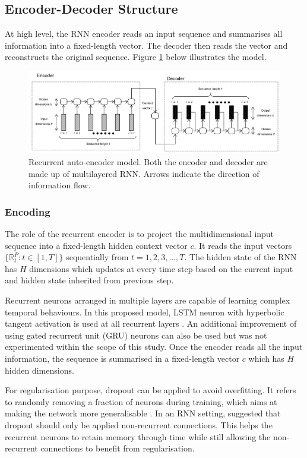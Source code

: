 \documentclass[runningheads]{llncs}
\begin{document}
\subsection{Encoder-Decoder Structure} 
At high level, the RNN encoder reads an input sequence and summarises all information into a fixed-length vector. The decoder then reads the vector and reconstructs the original sequence. Figure \ref{fig:seq2seq} below illustrates the model.

\begin{figure}[H]
	\centering
	\includegraphics[width=1\textwidth]{seq2seq.PNG}
	\caption{Recurrent auto-encoder model. Both the encoder and decoder are made up of multilayered RNN. Arrows indicate the direction of information flow.}
	\label{fig:seq2seq}
\end{figure}

\subsubsection{Encoding}

The role of the recurrent encoder is to project the multidimensional input sequence into a fixed-length hidden context vector \(c\). It reads the input vectors \(\{\mathbb{R}_t^P:t\in [1,T]\}\) sequentially from \(t=1,2,3,...,T\). The hidden state of the RNN has \(H\) dimensions which updates at every time step based on the current input and hidden state inherited from previous step.

Recurrent neurons arranged in multiple layers are capable of learning complex temporal behaviours. In this proposed model, LSTM neuron with hyperbolic tangent activation is used at all recurrent layers \cite{hochreiter1997}. An additional improvement of using gated recurrent unit (GRU) neurons \cite{cho2014} can also be used but was not experimented within the scope of this study. Once the encoder reads all the input information, the sequence is summarised in a fixed-length vector \(c\) which has \(H\) hidden dimensions.

For regularisation purpose, dropout can be applied to avoid overfitting. It refers to randomly removing a fraction of neurons during training, which aims at making the network more generalisable \cite{srivastava2014}. In an RNN setting, \cite{zaremba2014} suggested that dropout should only be applied non-recurrent connections. This helps the recurrent neurons to retain memory through time while still allowing the non-recurrent connections to benefit from regularisation.
\end{document}
